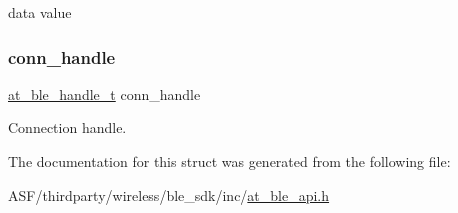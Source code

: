 data value 

\mbox{\label{structat__ble__notification__recieved__t_ae42df6fd8493f8f8faeccfdd6062e96f}} 
\subsubsection{\texorpdfstring{conn\_handle}{conn\_handle}}
{\footnotesize\ttfamily \mbox{\hyperlink{at__ble__api_8h_abd23646d0c662860741f787efc8456f2}{at\+\_\+ble\+\_\+handle\+\_\+t}} conn\+\_\+handle}



Connection handle. 



The documentation for this struct was generated from the following file\+:\begin{DoxyCompactItemize}
\item 
A\+S\+F/thirdparty/wireless/ble\+\_\+sdk/inc/\mbox{\hyperlink{at__ble__api_8h}{at\+\_\+ble\+\_\+api.\+h}}\end{DoxyCompactItemize}
